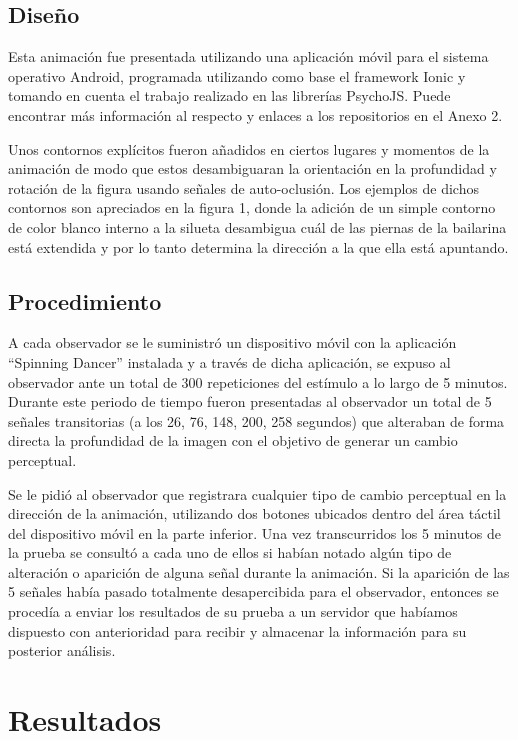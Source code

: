 \documentclass[jou]{apa6}
\begin{document}
\subsection{Diseño}
Esta animación fue presentada utilizando una aplicación móvil para el sistema operativo
Android, programada utilizando como base el framework Ionic y tomando en cuenta el
trabajo realizado en las librerías PsychoJS. Puede encontrar más información al respecto y
enlaces a los repositorios en el Anexo 2.

Unos contornos explícitos fueron añadidos en ciertos lugares y momentos de la
animación de modo que estos desambiguaran la orientación en la profundidad y rotación de la
figura usando señales de auto-oclusión. Los ejemplos de dichos contornos son apreciados en
la figura 1, donde la adición de un simple contorno de color blanco interno a la silueta
desambigua cuál de las piernas de la bailarina está extendida y por lo tanto determina la
dirección a la que ella está apuntando.

\subsection{Procedimiento}
A cada observador se le suministró un dispositivo
móvil con la aplicación “Spinning Dancer” instalada y a través de dicha aplicación, se expuso
al observador ante un total de 300 repeticiones del estímulo a lo largo de 5 minutos. Durante
este periodo de tiempo fueron presentadas al observador un total de 5 señales transitorias (a
los 26, 76, 148, 200, 258 segundos) que alteraban de forma directa la profundidad de la
imagen con el objetivo de generar un cambio perceptual.

Se le pidió al observador que registrara cualquier tipo de cambio perceptual en la
dirección de la animación, utilizando dos botones ubicados dentro del área táctil del
dispositivo móvil en la parte inferior. Una vez transcurridos los 5 minutos de la prueba se
consultó a cada uno de ellos si habían notado algún tipo de alteración o aparición de alguna
señal durante la animación. Si la aparición de las 5 señales había pasado totalmente
desapercibida para el observador, entonces se procedía a enviar los resultados de su prueba a
un servidor que habíamos dispuesto con anterioridad para recibir y almacenar la información
para su posterior análisis.

\section{Resultados}
\end{document}
